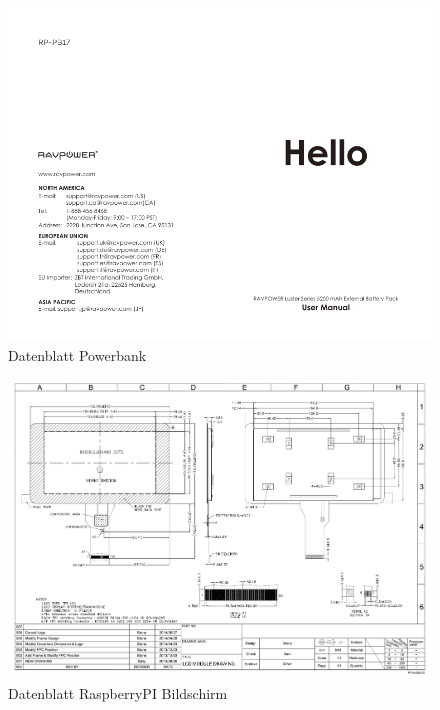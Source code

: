 \documentclass[12pt,a4paper]{article}
\begin{document}
{\begin{figure}[H]
  \centering
		\includegraphics[scale=1.5, angle=90,page=2]{graphics/powerbank.pdf}
		\caption{Datenblatt Powerbank}
		\label{datasheet:powerbank}
\end{figure}

\begin{figure}[H]
  \centering
		\includegraphics[scale=0.7, angle=90]{graphics/screen.pdf}
		\caption{Datenblatt RaspberryPI Bildschirm}
		\label{datasheet:raspiscreen}
\end{figure}

}
\end{document}

